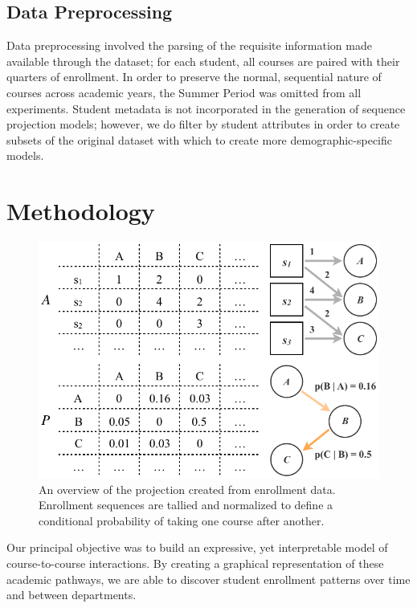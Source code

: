 \documentclass{sigchi}
\begin{document}
\subsection{Data Preprocessing}
\label{sec:data_processing}

Data preprocessing involved the parsing of the requisite information made available through the dataset; for each student, all courses are paired with their quarters of enrollment. In order to preserve the normal, sequential nature of courses across academic years, the Summer Period was omitted from all experiments. Student metadata is not incorporated in the generation of sequence projection models; however, we do filter by student attributes in order to create subsets of the original dataset with which to create more demographic-specific models.

\section{Methodology}
\label{sec:methodology}

\begin{figure}
    \centering
    \includegraphics[width=\columnwidth]{final-simple.pdf}
    \caption{An overview of the projection created from enrollment data. Enrollment sequences are tallied and normalized to define a conditional probability of taking one course after another.}
    \label{fig:simple}
\end{figure}

Our principal objective was to build an expressive, yet interpretable model of course-to-course interactions. By creating a graphical representation of these academic pathways, we are able to discover student enrollment patterns over time and between departments. 
\end{document}
